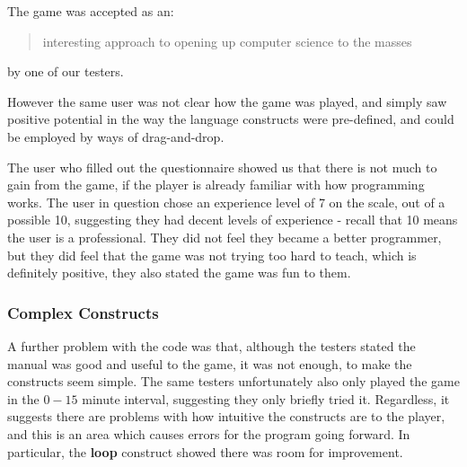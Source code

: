 The game was accepted as an: 

\begin{quotation}interesting approach to opening up computer science to the masses\end{quotation} by one of our testers.

However the same user was not clear how the game was played, and simply saw positive potential in the way the language constructs were pre-defined, and could be employed by ways of drag-and-drop. 


The user who filled out the questionnaire showed us that there is not much to gain from the game, if the player is already familiar with how programming works. The user in question chose an experience level of 7 on the scale, out of a possible 10, suggesting they had decent levels of experience - recall that 10 means the user is a professional. They did not feel they became a better programmer, but they did feel that the game was not trying too hard to teach, which is definitely positive, they also stated the game was fun to them.


\subsubsection{Complex Constructs}

A further problem with the code was that, although the testers stated the manual was good and useful to the game, it was not enough, to make the constructs seem simple. The same testers unfortunately also only played the game in the $0-15$ minute interval, suggesting they only briefly tried it. Regardless, it suggests there are problems with how intuitive the constructs are to the player, and this is an area which causes errors for the program going forward. In particular, the \textbf{loop} construct showed there was room for improvement.